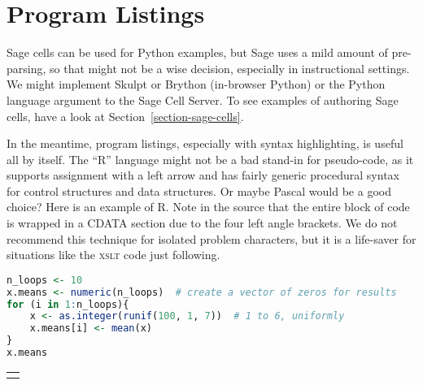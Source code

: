 \documentclass[10pt,]{article}
\newcommand{\initialism}[1]{\textsc{\MakeLowercase{#1}}}
\theoremstyle{plain}
\theoremstyle{definition}
\theoremstyle{definition}
\theoremstyle{definition}
\theoremstyle{definition}
\theoremstyle{definition}
\theoremstyle{definition}
\numberwithin{equation}{section}
\newlength{\panelmax}
\begin{document}
\section[{Program Listings}]{Program Listings}\label{section-programs}
\hypertarget{p-619}{}%
Sage cells can be used for Python examples, but Sage uses a mild amount of pre-parsing, so that might not be a wise decision, especially in instructional settings.  We might implement Skulpt or Brython (in-browser Python) or the Python language argument to the Sage Cell Server.  To see examples of authoring Sage cells, have a look at Section~\hyperref[section-sage-cells]{\ref{section-sage-cells}}.%
\par
\hypertarget{p-620}{}%
In the meantime, program listings, especially with syntax highlighting, is useful all by itself.  The ``R'' language might not be a bad stand-in for pseudo-code, as it supports assignment with a left arrow and has fairly generic procedural syntax for control structures and data structures.  Or maybe Pascal would be a good choice?  Here is an example of R.  Note in the source that the entire block of code is wrapped in a CDATA section due to the four left angle brackets.  We do not recommend this technique for isolated problem characters, but it is a life-saver for situations like the \initialism{XSLT} code just following.%
{%
\setlength{\panelmax}{0pt}
\ifdefined\panelboxAprogram\else\newsavebox{\panelboxAprogram}\fi%
\begin{lrbox}{\panelboxAprogram}
\begin{lstlisting}[style=genericinput, language=R, linewidth=1\linewidth]
n_loops <- 10
x.means <- numeric(n_loops)  # create a vector of zeros for results
for (i in 1:n_loops){
    x <- as.integer(runif(100, 1, 7))  # 1 to 6, uniformly
    x.means[i] <- mean(x)
}
x.means
\end{lstlisting}
\end{lrbox}
\ifdefined\phAprogram\else\newlength{\phAprogram}\fi%
\setlength{\phAprogram}{\ht\panelboxAprogram+\dp\panelboxAprogram}
\settototalheight{\phAprogram}{\usebox{\panelboxAprogram}}
\setlength{\panelmax}{\maxof{\panelmax}{\phAprogram}}
\leavevmode%
\setlength{\tabcolsep}{0\linewidth}
\par\medskip\noindent
\begin{tabular}{@{}*{1}{c}@{}}
\begin{minipage}[c][\panelmax][t]{1\linewidth}\usebox{\panelboxAprogram}\end{minipage}\end{tabular}\\
}%
\end{document}
